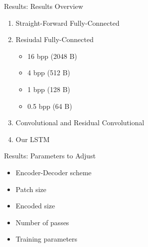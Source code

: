 \documentclass[10pt]{beamer}
\begin{document}
  \begin{frame}{Results: Results Overview}
    \begin{enumerate}
      \item Straight-Forward Fully-Connected
      \item Resiudal Fully-Connected
        \begin{itemize}
          \item 16 bpp (2048 B)
          \item 4 bpp (512 B)
          \item 1 bpp (128 B)
          \item 0.5 bpp (64 B)
        \end{itemize}
      \item Convolutional and Residual Convolutional
      \item Our LSTM
    \end{enumerate}
  \end{frame}


  \begin{frame}{Results: Parameters to Adjust}
    \begin{itemize}
      \item Encoder-Decoder scheme
      \item Patch size
      \item Encoded size
      \item Number of passes
      \item Training parameters
    \end{itemize}
  \end{frame}
\end{document}
